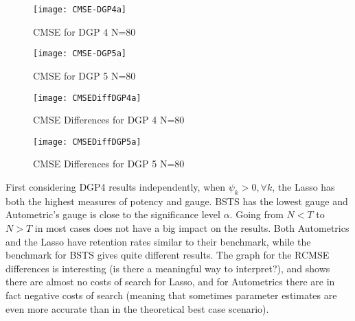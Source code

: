 \documentclass[11pt, oneside]{book}   	%
\begin{document}
\begin{figure}[h]

\begin{minipage}{.5\textwidth}
\centering
\texttt{[image: CMSE-DGP4a]}
\caption{CMSE for DGP 4 \newline N=80}
\label{fig:CMSEDGP4a}
\end{minipage}%
\begin{minipage}{.5\textwidth}
\centering
\texttt{[image: CMSE-DGP5a]}
\caption{CMSE for DGP 5 \newline N=80}
\label{fig:CMSEDGP5a}

\end{minipage}

\end{figure}

\begin{figure}[h]

\begin{minipage}{.5\textwidth}
\centering
\texttt{[image: CMSEDiffDGP4a]}
\caption{CMSE Differences for DGP 4 \newline N=80}
\label{fig:CMSEDiffDGP4a}
\end{minipage}%
\begin{minipage}{.5\textwidth}
\centering
\texttt{[image: CMSEDiffDGP5a]}
\caption{CMSE Differences for DGP 5 \newline N=80}
\label{fig:CMSEDiffDGP5a}

\end{minipage}

\end{figure}





\clearpage


First considering DGP4 results independently, when $\psi_{k} > 0, \forall k$, the Lasso has both the highest measures of potency and gauge. BSTS has the lowest gauge and Autometric's gauge is close to the significance level $\alpha$. Going from $N<T$ to $N>T$ in most cases does not have a big impact on the results. Both Autometrics and the Lasso have retention rates similar to their benchmark, while the benchmark for BSTS gives quite different results. The graph for the RCMSE differences is interesting (is there a meaningful way to interpret?), and shows there are almost no costs of search for Lasso, and for Autometrics there are in fact negative costs of search (meaning that sometimes parameter estimates are even more accurate than in the theoretical best case scenario).
\end{document}
